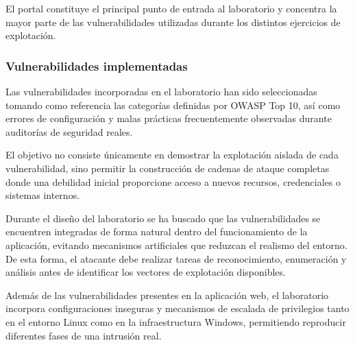 El portal constituye el principal punto de entrada al laboratorio y concentra la mayor parte de las vulnerabilidades utilizadas durante los distintos ejercicios de explotación.


\subsubsection{Vulnerabilidades implementadas}

Las vulnerabilidades incorporadas en el laboratorio han sido seleccionadas tomando como referencia las categorías definidas por OWASP Top 10, así como errores de configuración y malas prácticas frecuentemente observadas durante auditorías de seguridad reales.

El objetivo no consiste únicamente en demostrar la explotación aislada de cada vulnerabilidad, sino permitir la construcción de cadenas de ataque completas donde una debilidad inicial proporcione acceso a nuevos recursos, credenciales o sistemas internos.

Durante el diseño del laboratorio se ha buscado que las vulnerabilidades se encuentren integradas de forma natural dentro del funcionamiento de la aplicación, evitando mecanismos artificiales que reduzcan el realismo del entorno. De esta forma, el atacante debe realizar tareas de reconocimiento, enumeración y análisis antes de identificar los vectores de explotación disponibles.

Además de las vulnerabilidades presentes en la aplicación web, el laboratorio incorpora configuraciones inseguras y mecanismos de escalada de privilegios tanto en el entorno Linux como en la infraestructura Windows, permitiendo reproducir diferentes fases de una intrusión real.

\vspace{0.5cm}
\renewcommand{\arraystretch}{1.5}

